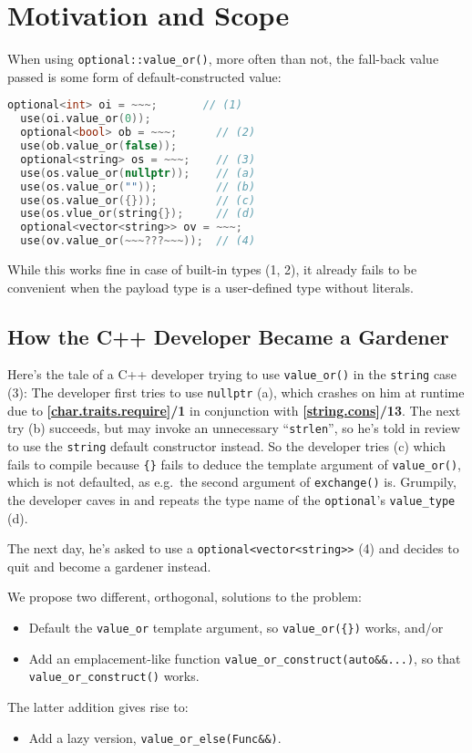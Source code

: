 \documentclass[11pt]{article}
\newcommand{\isnref}[2]{\textbf{[\href{https://wg21.link/#1\##2}{#1}]/#2}}
\begin{document}
\section{Motivation and Scope}

When using \texttt{optional::value\_or()}, more often than not, the
fall-back value passed is some form of default-constructed value:

\begin{lstlisting}[language=c++]
  optional<int> oi = ~~~;       // (1)
  use(oi.value_or(0));
  optional<bool> ob = ~~~;      // (2)
  use(ob.value_or(false));
  optional<string> os = ~~~;    // (3)
  use(os.value_or(nullptr));    // (a)
  use(os.value_or(""));         // (b)
  use(os.value_or({}));         // (c)
  use(os.vlue_or(string{});     // (d)
  optional<vector<string>> ov = ~~~;
  use(ov.value_or(~~~???~~~));  // (4)
\end{lstlisting}

While this works fine in case of built-in types (1, 2), it already
fails to be convenient when the payload type is a user-defined type
without literals.

\subsection{How the C++ Developer Became a Gardener}

Here's the tale of a C++ developer trying to use \texttt{value\_or()}
in the \texttt{string} case (3): The developer first tries to use
\texttt{nullptr} (a), which crashes on him at runtime due to
\isnref{char.traits.require}1 in conjunction with
\isnref{string.cons}{13}. The next try (b) succeeds, but may invoke an
unnecessary ``\texttt{strlen}'', so he's told in review to use the
\texttt{string} default constructor instead. So the developer tries
(c) which fails to compile because \texttt{\{\}} fails to deduce the
template argument of \texttt{value\_or()}, which is not defaulted, as
e.g.\ the second argument of \texttt{exchange()} is. Grumpily, the
developer caves in and repeats the type name of the
\texttt{optional}'s \texttt{value\_type} (d).

The next day, he's asked to use a \texttt{optional<vector<string>>}
(4) and decides to quit and become a gardener instead.

We propose two different, orthogonal, solutions to the problem:
\begin{itemize}
\item Default the \texttt{value\_or} template argument, so
  \texttt{value\_or(\{\})} works, and/or
\item Add an emplacement-like function \texttt{value\_or\_construct(auto\&\&...)}, so
  that \texttt{value\_or\_construct()} works.
\end{itemize}
The latter addition gives rise to:
\begin{itemize}
\item Add a lazy version, \texttt{value\_or\_else(Func\&\&)}.
\end{itemize}
\end{document}
